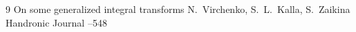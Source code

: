\begin{thebibliography}{9}
\paper On some generalized integral transforms
\by N.~Virchenko, S.~L.~Kalla, S.~Zaikina
\jour Handronic Journal
--548


\end{thebibliography}

\renewcommand{\doihacke}{\linebreak}


\makeentitle

\renewcommand{\baselinestretch}{0.9}

\newpage




%

